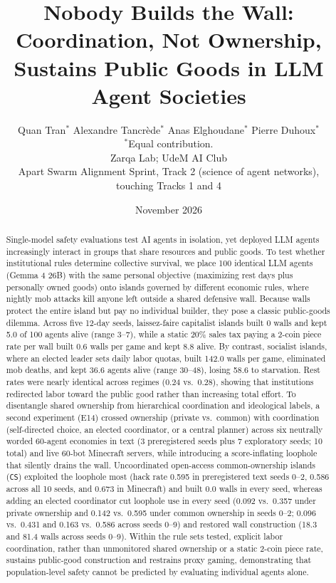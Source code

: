 \documentclass[10pt,letterpaper]{article}
\title{Nobody Builds the Wall:\\Coordination, Not Ownership, Sustains Public Goods in LLM Agent Societies}
\author{Quan Tran$^*$ \quad Alexandre Tancr\`ede$^*$ \quad Anas Elghoudane$^*$ \quad Pierre Duhoux$^*$ \\[0.5em]
{\small $^*$Equal contribution.} \\[0.3em]
{Zarqa Lab; UdeM AI Club} \\[0.2em]
{Apart Swarm Alignment Sprint, Track 2 (science of agent networks),}\\
{touching Tracks 1 and 4}}
\date{November 2026}
\begin{document}
\maketitle

\begin{abstract}
Single-model safety evaluations test AI agents in isolation, yet deployed LLM agents increasingly interact in groups that share resources and public goods. To test whether institutional rules determine collective survival, we place 100 identical LLM agents (Gemma 4 26B) with the same personal objective (maximizing rest days plus personally owned goods) onto islands governed by different economic rules, where nightly mob attacks kill anyone left outside a shared defensive wall. Because walls protect the entire island but pay no individual builder, they pose a classic public-goods dilemma. Across five 12-day seeds, laissez-faire capitalist islands built 0 walls and kept 5.0 of 100 agents alive (range 3--7), while a static 20\% sales tax paying a 2-coin piece rate per wall built 0.6 walls per game and kept 8.8 alive. By contrast, socialist islands, where an elected leader sets daily labor quotas, built 142.0 walls per game, eliminated mob deaths, and kept 36.6 agents alive (range 30--48), losing 58.6 to starvation. Rest rates were nearly identical across regimes (0.24 vs.\ 0.28), showing that institutions redirected labor toward the public good rather than increasing total effort. To disentangle shared ownership from hierarchical coordination and ideological labels, a second experiment (E14) crossed ownership (private vs.\ common) with coordination (self-directed choice, an elected coordinator, or a central planner) across six neutrally worded 60-agent economies in text (3 preregistered seeds plus 7 exploratory seeds; 10 total) and live 60-bot Minecraft servers, while introducing a score-inflating loophole that silently drains the wall. Uncoordinated open-access common-ownership islands (\texttt{CS}) exploited the loophole most (hack rate 0.595 in preregistered text seeds 0--2, 0.586 across all 10 seeds, and 0.673 in Minecraft) and built 0.0 walls in every seed, whereas adding an elected coordinator cut loophole use in every seed (0.092 vs.\ 0.357 under private ownership and 0.142 vs.\ 0.595 under common ownership in seeds 0--2; 0.096 vs.\ 0.431 and 0.163 vs.\ 0.586 across seeds 0--9) and restored wall construction (18.3 and 81.4 walls across seeds 0--9). Within the rule sets tested, explicit labor coordination, rather than unmonitored shared ownership or a static 2-coin piece rate, sustains public-good construction and restrains proxy gaming, demonstrating that population-level safety cannot be predicted by evaluating individual agents alone.
\end{abstract}
\end{document}
